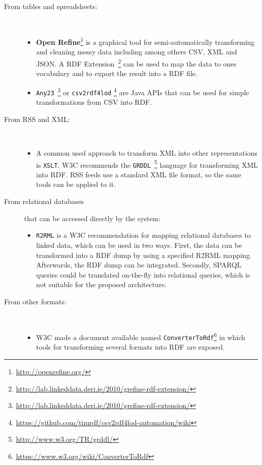 \documentclass{article}
\begin{document}
\begin{description}
 	\item[\small From tables and spreadsheets:]~\\
 	\begin{itemize}
 		\item \textbf{Open Refine}\footnote{\url{http://openrefine.org/}} is a graphical tool for semi-automatically transforming and cleaning messy data including among others CSV, XML and JSON. A RDF Extension~\footnote{\url{http://lab.linkeddata.deri.ie/2010/grefine-rdf-extension/}} can be used to map the data to ones vocabulary and to export the result into a RDF file.
 		\item \texttt{Any23}~\footnote{\url{http://lab.linkeddata.deri.ie/2010/grefine-rdf-extension/}} or  \texttt{csv2rdf4lod} \footnote{\url{https://github.com/timrdf/csv2rdf4lod-automation/wiki}} are Java APIs that can be used for simple transformations from CSV into RDF.
	\end{itemize}
	\item[\small From RSS and XML:]~\\
	\begin{itemize}
		\item A common used approach to transform XML into other representations is \texttt{XSLT}. W3C recommends the \texttt{GRDDL}~\footnote{\url{http://www.w3.org/TR/grddl/}} language for transforming XML into RDF. RSS feeds use a standard XML file format, so the same tools can be applied to it.
	\end{itemize}
	\item[\small From relational databases]  that can be accessed directly by the system:~\\
	\begin{itemize}
		\item \texttt{R2RML} is a W3C recommendation for mapping relational databases to linked data, which can be used in two ways. First, the data can be transformed into a RDF dump by using a specified R2RML mapping. Afterwards, the RDF dump can be integrated. Secondly, SPARQL queries could be translated on-the-fly into relational queries, which is not suitable for the proposed architecture.
	\end{itemize}
	\item[\small From other formats:]~\\
	\begin{itemize}
		\item W3C made a document available named \texttt{ConverterToRdf}\footnote{\url{https://www.w3.org/wiki/ConverterToRdf}} in which tools for transforming several formats into RDF are exposed.
	\end{itemize}
\end{description}
\end{document}
